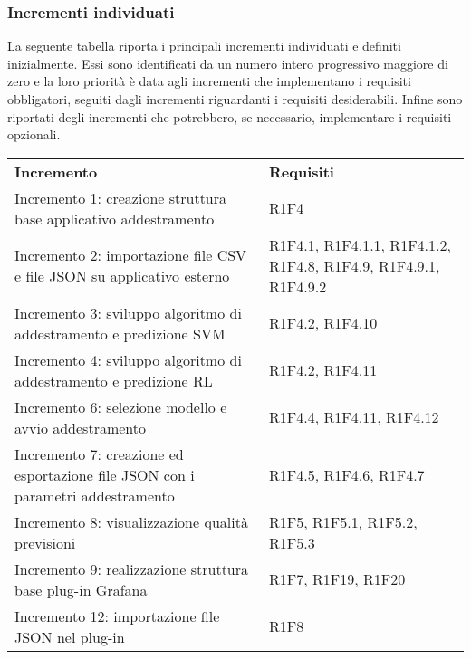 \subsubsection{Incrementi individuati}
La seguente tabella riporta i principali incrementi individuati e definiti inizialmente. Essi sono identificati da un numero intero progressivo maggiore di zero e la loro priorità è data agli incrementi che implementano i requisiti obbligatori, seguiti dagli incrementi riguardanti i requisiti desiderabili. Infine sono riportati degli incrementi che potrebbero, se necessario, implementare i requisiti opzionali.
\begin{longtable} {
		>{\raggedright\arraybackslash}p{85mm}
		>{\raggedleft\arraybackslash}p{40mm}
	}
	\rowcolor{gray!50} 
	\textbf{Incremento} & 
	\textbf{Requisiti} 	\TBstrut \\
	
	Incremento 1: creazione struttura base applicativo addestramento &
	R1F4  \TBstrut \\ [2mm]		
	
	Incremento 2: importazione file CSV e file JSON su applicativo esterno & 
	R1F4.1, R1F4.1.1, R1F4.1.2, R1F4.8, R1F4.9, R1F4.9.1, R1F4.9.2  \TBstrut \\ [2mm]
	
	Incremento 3: sviluppo algoritmo di addestramento e predizione SVM\glosp & 
	R1F4.2, R1F4.10  \TBstrut \\ [2mm]
	
	Incremento 4: sviluppo algoritmo di addestramento e predizione RL\glosp & 
	R1F4.2, R1F4.11 \TBstrut \\ [2mm]
	
	Incremento 6: selezione modello e avvio addestramento & 
	R1F4.4, R1F4.11, R1F4.12 \TBstrut \\ [2mm]
	
	Incremento 7: creazione ed esportazione file JSON con i parametri addestramento &
	R1F4.5, R1F4.6, R1F4.7 \TBstrut \\ [2mm]
	
	Incremento 8: visualizzazione qualità previsioni &
	R1F5, R1F5.1, R1F5.2, R1F5.3 \TBstrut \\ [2mm]
	
	Incremento 9: realizzazione struttura base plug-in Grafana\glosp &
	R1F7, R1F19, R1F20 \TBstrut \\ [2mm]
	
	Incremento 12: importazione file JSON nel plug-in &
	R1F8 \TBstrut \\ [2mm]
	

\end{longtable}
